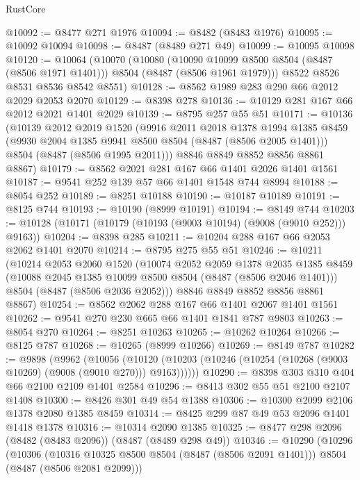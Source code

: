\begin{lexlean}{RustCore}
\begin{coremodule}
@10092 := @8477 @271 @1976
@10094 := @8482 (@8483 @1976)
@10095 := @10092 @10094
@10098 := @8487 (@8489 @271 @49)
@10099 := @10095 @10098
@10120 := @10064
    (@10070
      (@10080
        (@10090 @10099 @8500 @8504 (@8487 (@8506 @1971 @1401)))
        @8504
        (@8487 (@8506 @1961 @1979)))
      @8522
      @8526
      @8531
      @8536
      @8542
      @8551)
@10128 := @8562 @1989 @283 @290 @66 @2012 @2029 @2053 @2070
@10129 := @8398 @278
@10136 := @10129 @281 @167 @66 @2012 @2021 @1401 @2029
@10139 := @8795 @257 @55 @51
@10171 := @10136
    (@10139
      @2012
      @2019
      @1520
      (@9916
        @2011
        @2018
        @1378
        @1994
        @1385
        @8459
        (@9930 @2004 @1385 @9941 @8500 @8504 (@8487 (@8506 @2005 @1401)))
        @8504
        (@8487 (@8506 @1995 @2011)))
      @8846
      @8849
      @8852
      @8856
      @8861
      @8867)
@10179 := @8562 @2021 @281 @167 @66 @1401 @2026 @1401 @1561
@10187 := @9541 @252 @139 @57 @66 @1401 @1548 @744 @8994
@10188 := @8054 @252
@10189 := @8251 @10188
@10190 := @10187 @10189
@10191 := @8125 @744
@10193 := @10190 (@8999 @10191)
@10194 := @8149 @744
@10203 := @10128 (@10171 (@10179 (@10193 (@9003 @10194) (@9008 (@9010 @252))) @9163))
@10204 := @8398 @285
@10211 := @10204 @288 @167 @66 @2053 @2062 @1401 @2070
@10214 := @8795 @275 @55 @51
@10246 := @10211
    (@10214
      @2053
      @2060
      @1520
      (@10074
        @2052
        @2059
        @1378
        @2035
        @1385
        @8459
        (@10088 @2045 @1385 @10099 @8500 @8504 (@8487 (@8506 @2046 @1401)))
        @8504
        (@8487 (@8506 @2036 @2052)))
      @8846
      @8849
      @8852
      @8856
      @8861
      @8867)
@10254 := @8562 @2062 @288 @167 @66 @1401 @2067 @1401 @1561
@10262 := @9541 @270 @230 @665 @66 @1401 @1841 @787 @9803
@10263 := @8054 @270
@10264 := @8251 @10263
@10265 := @10262 @10264
@10266 := @8125 @787
@10268 := @10265 (@8999 @10266)
@10269 := @8149 @787
@10282 := @9898
    (@9962
      (@10056
        (@10120 (@10203 (@10246 (@10254 (@10268 (@9003 @10269) (@9008 (@9010 @270))) @9163))))))
@10290 := @8398 @303 @310 @404 @66 @2100 @2109 @1401 @2584
@10296 := @8413 @302 @55 @51 @2100 @2107 @1408
@10300 := @8426 @301 @49 @54 @1388
@10306 := @10300 @2099 @2106 @1378 @2080 @1385 @8459
@10314 := @8425 @299 @87 @49 @53 @2096 @1401 @1418 @1378
@10316 := @10314 @2090 @1385
@10325 := @8477 @298 @2096 (@8482 (@8483 @2096)) (@8487 (@8489 @298 @49))
@10346 := @10290
    (@10296
      (@10306
        (@10316 @10325 @8500 @8504 (@8487 (@8506 @2091 @1401)))
        @8504
        (@8487 (@8506 @2081 @2099)))

\end{coremodule}
\end{lexlean}
